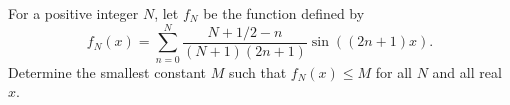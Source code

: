 For a positive integer $N$, let $f_N$ be the function defined by
\[ f_N (x)=\sum_{n=0}^N \frac{N+1/2-n}{(N+1)(2n+1)} \sin\left((2n+1)x \right). \]Determine the smallest constant $M$ such that $f_N (x)\le M$ for all $N$ and all real $x$.